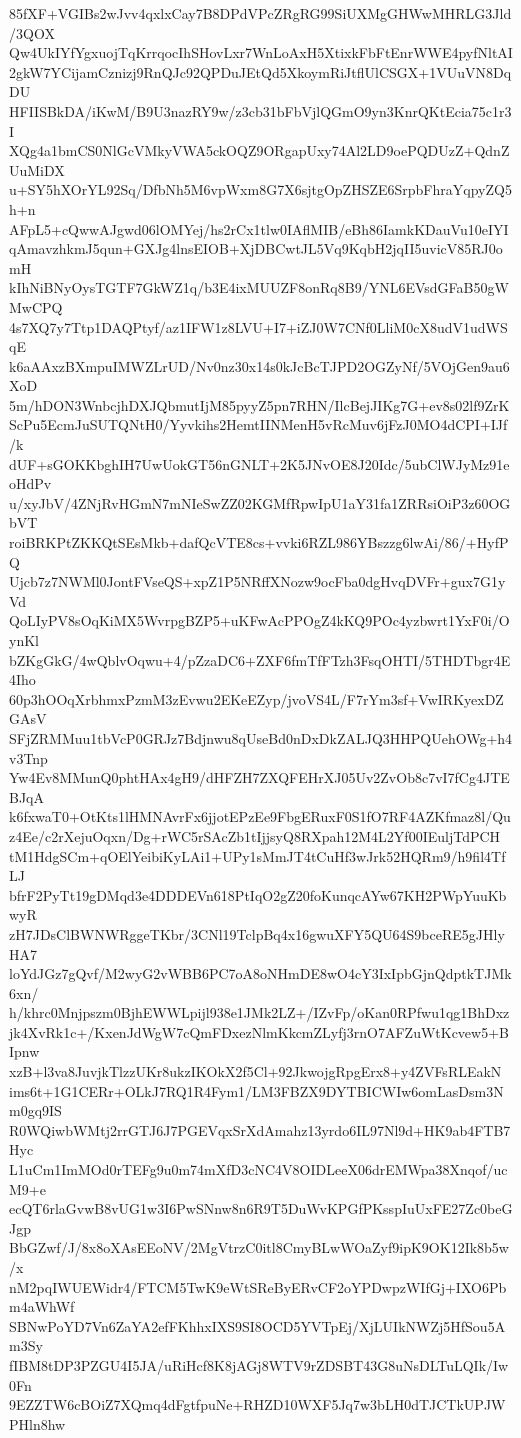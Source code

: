 85fXF+VGIBs2wJvv4qxlxCay7B8DPdVPcZRgRG99SiUXMgGHWwMHRLG3Jld/3QOX
Qw4UkIYfYgxuojTqKrrqocIhSHovLxr7WnLoAxH5XtixkFbFtEnrWWE4pyfNltAI
2gkW7YCijamCznizj9RnQJc92QPDuJEtQd5XkoymRiJtflUlCSGX+1VUuVN8DqDU
HFIISBkDA/iKwM/B9U3nazRY9w/z3cb31bFbVjlQGmO9yn3KnrQKtEcia75c1r3I
XQg4a1bmCS0NlGcVMkyVWA5ckOQZ9ORgapUxy74Al2LD9oePQDUzZ+QdnZUuMiDX
u+SY5hXOrYL92Sq/DfbNh5M6vpWxm8G7X6sjtgOpZHSZE6SrpbFhraYqpyZQ5h+n
AFpL5+cQwwAJgwd06lOMYej/hs2rCx1tlw0IAflMIB/eBh86IamkKDauVu10eIYI
qAmavzhkmJ5qun+GXJg4lnsEIOB+XjDBCwtJL5Vq9KqbH2jqII5uvicV85RJ0omH
kIhNiBNyOysTGTF7GkWZ1q/b3E4ixMUUZF8onRq8B9/YNL6EVsdGFaB50gWMwCPQ
4s7XQ7y7Ttp1DAQPtyf/az1IFW1z8LVU+I7+iZJ0W7CNf0LliM0cX8udV1udWSqE
k6aAAxzBXmpuIMWZLrUD/Nv0nz30x14s0kJcBcTJPD2OGZyNf/5VOjGen9au6XoD
5m/hDON3WnbcjhDXJQbmutIjM85pyyZ5pn7RHN/IlcBejJIKg7G+ev8s02lf9ZrK
ScPu5EcmJuSUTQNtH0/Yyvkihs2HemtIINMenH5vRcMuv6jFzJ0MO4dCPI+IJf/k
dUF+sGOKKbghIH7UwUokGT56nGNLT+2K5JNvOE8J20Idc/5ubClWJyMz91eoHdPv
u/xyJbV/4ZNjRvHGmN7mNIeSwZZ02KGMfRpwIpU1aY31fa1ZRRsiOiP3z60OGbVT
roiBRKPtZKKQtSEsMkb+dafQcVTE8cs+vvki6RZL986YBszzg6lwAi/86/+HyfPQ
Ujcb7z7NWMl0JontFVseQS+xpZ1P5NRffXNozw9ocFba0dgHvqDVFr+gux7G1yVd
QoLIyPV8sOqKiMX5WvrpgBZP5+uKFwAcPPOgZ4kKQ9POc4yzbwrt1YxF0i/OynKl
bZKgGkG/4wQblvOqwu+4/pZzaDC6+ZXF6fmTfFTzh3FsqOHTI/5THDTbgr4E4Iho
60p3hOOqXrbhmxPzmM3zEvwu2EKeEZyp/jvoVS4L/F7rYm3sf+VwIRKyexDZGAsV
SFjZRMMuu1tbVcP0GRJz7Bdjnwu8qUseBd0nDxDkZALJQ3HHPQUehOWg+h4v3Tnp
Yw4Ev8MMunQ0phtHAx4gH9/dHFZH7ZXQFEHrXJ05Uv2ZvOb8c7vI7fCg4JTEBJqA
k6fxwaT0+OtKts1lHMNAvrFx6jjotEPzEe9FbgERuxF0S1fO7RF4AZKfmaz8l/Qu
z4Ee/c2rXejuOqxn/Dg+rWC5rSAcZb1tIjjsyQ8RXpah12M4L2Yf00IEuljTdPCH
tM1HdgSCm+qOElYeibiKyLAi1+UPy1sMmJT4tCuHf3wJrk52HQRm9/h9fil4TfLJ
bfrF2PyTt19gDMqd3e4DDDEVn618PtIqO2gZ20foKunqcAYw67KH2PWpYuuKbwyR
zH7JDsClBWNWRggeTKbr/3CNl19TclpBq4x16gwuXFY5QU64S9bceRE5gJHlyHA7
loYdJGz7gQvf/M2wyG2vWBB6PC7oA8oNHmDE8wO4cY3IxIpbGjnQdptkTJMk6xn/
h/khrc0Mnjpszm0BjhEWWLpijl938e1JMk2LZ+/IZvFp/oKan0RPfwu1qg1BhDxz
jk4XvRk1c+/KxenJdWgW7cQmFDxezNlmKkcmZLyfj3rnO7AFZuWtKcvew5+BIpnw
xzB+l3va8JuvjkTlzzUKr8ukzIKOkX2f5Cl+92JkwojgRpgErx8+y4ZVFsRLEakN
ims6t+1G1CERr+OLkJ7RQ1R4Fym1/LM3FBZX9DYTBICWIw6omLasDsm3Nm0gq9IS
R0WQiwbWMtj2rrGTJ6J7PGEVqxSrXdAmahz13yrdo6IL97Nl9d+HK9ab4FTB7Hyc
L1uCm1ImMOd0rTEFg9u0m74mXfD3cNC4V8OIDLeeX06drEMWpa38Xnqof/ucM9+e
ecQT6rlaGvwB8vUG1w3I6PwSNnw8n6R9T5DuWvKPGfPKsspIuUxFE27Zc0beGJgp
BbGZwf/J/8x8oXAsEEoNV/2MgVtrzC0itl8CmyBLwWOaZyf9ipK9OK12Ik8b5w/x
nM2pqIWUEWidr4/FTCM5TwK9eWtSReByERvCF2oYPDwpzWIfGj+IXO6Pbm4aWhWf
SBNwPoYD7Vn6ZaYA2efFKhhxIXS9SI8OCD5YVTpEj/XjLUIkNWZj5HfSou5Am3Sy
fIBM8tDP3PZGU4I5JA/uRiHcf8K8jAGj8WTV9rZDSBT43G8uNsDLTuLQIk/Iw0Fn
9EZZTW6cBOiZ7XQmq4dFgtfpuNe+RHZD10WXF5Jq7w3bLH0dTJCTkUPJWPHln8hw
